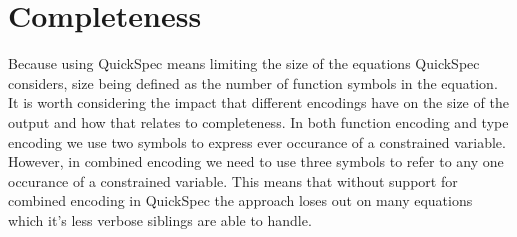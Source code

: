 \section{Completeness}

Because using QuickSpec means limiting the size
of the equations QuickSpec considers, size being
defined as the number of function symbols in the
equation. It is worth considering the impact that
different encodings have on the size of the output
and how that relates to completeness. In both
function encoding and type encoding we use two
symbols to express ever occurance of
a constrained variable. However, in
combined encoding we need to use three symbols
to refer to any one occurance of a constrained variable.
This means that without support for combined encoding in
QuickSpec the approach loses out on many equations which
it's less verbose siblings are able to handle.
